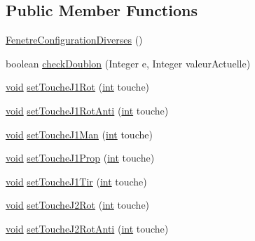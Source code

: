 \subsection*{Public Member Functions}
\begin{DoxyCompactItemize}
\item 
\hyperlink{class_interface_graphique_1_1_fenetre_configuration_diverses_a476caf795e2528a6fa818e0a3007b6db}{Fenetre\-Configuration\-Diverses} ()
\item 
boolean \hyperlink{class_interface_graphique_1_1_fenetre_configuration_diverses_a06f5a9d5cb4823955aedbabf38b2e72b}{check\-Doublon} (Integer e, Integer valeur\-Actuelle)
\item 
\hyperlink{wglew_8h_aeea6e3dfae3acf232096f57d2d57f084}{void} \hyperlink{class_interface_graphique_1_1_fenetre_configuration_diverses_a824b8586effdc433dcc4eb050c1967fa}{set\-Touche\-J1\-Rot} (\hyperlink{wglew_8h_a500a82aecba06f4550f6849b8099ca21}{int} touche)
\item 
\hyperlink{wglew_8h_aeea6e3dfae3acf232096f57d2d57f084}{void} \hyperlink{class_interface_graphique_1_1_fenetre_configuration_diverses_a1368d63404611c0e099a879ed3c59c57}{set\-Touche\-J1\-Rot\-Anti} (\hyperlink{wglew_8h_a500a82aecba06f4550f6849b8099ca21}{int} touche)
\item 
\hyperlink{wglew_8h_aeea6e3dfae3acf232096f57d2d57f084}{void} \hyperlink{class_interface_graphique_1_1_fenetre_configuration_diverses_ad48ef33a074eff0fb20e7ced7d8e9571}{set\-Touche\-J1\-Man} (\hyperlink{wglew_8h_a500a82aecba06f4550f6849b8099ca21}{int} touche)
\item 
\hyperlink{wglew_8h_aeea6e3dfae3acf232096f57d2d57f084}{void} \hyperlink{class_interface_graphique_1_1_fenetre_configuration_diverses_a7f8f35410a4b4055613f043ebbdb1575}{set\-Touche\-J1\-Prop} (\hyperlink{wglew_8h_a500a82aecba06f4550f6849b8099ca21}{int} touche)
\item 
\hyperlink{wglew_8h_aeea6e3dfae3acf232096f57d2d57f084}{void} \hyperlink{class_interface_graphique_1_1_fenetre_configuration_diverses_aa5fde8ce18a8bbe6e09849e4cf363085}{set\-Touche\-J1\-Tir} (\hyperlink{wglew_8h_a500a82aecba06f4550f6849b8099ca21}{int} touche)
\item 
\hyperlink{wglew_8h_aeea6e3dfae3acf232096f57d2d57f084}{void} \hyperlink{class_interface_graphique_1_1_fenetre_configuration_diverses_a612fee2b4384d7c9c0ac4ff9133ccc6c}{set\-Touche\-J2\-Rot} (\hyperlink{wglew_8h_a500a82aecba06f4550f6849b8099ca21}{int} touche)
\item 
\hyperlink{wglew_8h_aeea6e3dfae3acf232096f57d2d57f084}{void} \hyperlink{class_interface_graphique_1_1_fenetre_configuration_diverses_a243277b075d66b45b9fa73129c758d55}{set\-Touche\-J2\-Rot\-Anti} (\hyperlink{wglew_8h_a500a82aecba06f4550f6849b8099ca21}{int} touche)

\end{DoxyCompactItemize}
